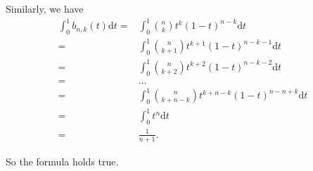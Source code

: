 \documentclass[a4paper]{article}
\begin{document}
Similarly, we have
$$
  \begin{aligned}
    \int_{0}^{1} b_{n,k}(t) \mathrm{d}t
  =&\int_{0}^{1} \binom{n}{k}t^k(1-t)^{n-k} \mathrm{d}t \\
  =&\int_{0}^{1} \binom{n}{k+1}t^{k+1}(1-t)^{n-k-1}\mathrm{d}t \\
  =&\int_{0}^{1} \binom{n}{k+2}t^{k+2}(1-t)^{n-k-2}\mathrm{d}t \\
  =&\dots \\
  =&\int_{0}^{1} \binom{n}{k+n-k}t^{k+n-k}(1-t)^{n-n+k}\mathrm{d}t \\
  =&\int_0^1t^n\mathrm{d}t \\
  =&\frac{1}{n+1}.
  \end{aligned}
$$

So the formula holds true.
\end{document}
